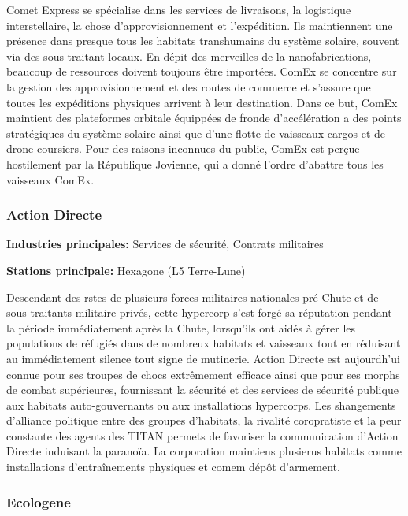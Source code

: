                   Comet Express se spécialise dans les services de livraisons, la logistique interstellaire, la chose d'approvisionnement et l'expédition. Ils maintiennent une présence dans presque tous les habitats transhumains du système solaire, souvent via des sous-traitant locaux. En dépit des merveilles de la nanofabrications, beaucoup de ressources doivent toujours être importées. ComEx se concentre sur la gestion des approvisionnement et des routes de commerce et s'assure que toutes les expéditions physiques arrivent à leur destination. Dans ce but, ComEx maintient des plateformes orbitale équippées de fronde d'accélération a des points stratégiques du système solaire ainsi que d'une flotte de vaisseaux cargos et de drone coursiers. Pour des raisons inconnues du public, ComEx est perçue hostilement par la République Jovienne, qui a donné l'ordre d'abattre tous les vaisseaux ComEx. 

                  \subsubsection{Action Directe} \label{sec:direct-action} 

                  \textbf{Industries principales:} Services de sécurité, Contrats militaires 

                  \textbf{Stations principale:} Hexagone (L5 Terre-Lune) 

                  Descendant des rstes de plusieurs forces militaires nationales pré-Chute et de sous-traitants militaire privés, cette hypercorp s'est forgé sa réputation pendant la période immédiatement après la Chute, lorsqu'ils ont aidés à gérer les populations de réfugiés dans de nombreux habitats et vaisseaux tout en réduisant au immédiatement silence tout signe de mutinerie. Action Directe est aujourdh'ui connue pour ses troupes de chocs extrêmement efficace ainsi que pour ses morphs de combat supérieures, fournissant la sécurité et des services de sécurité publique aux habitats auto-gouvernants ou aux installations hypercorps. Les shangements d'alliance politique entre des groupes d'habitats, la rivalité coropratiste et la peur constante des agents des TITAN permets de favoriser la communication d'Action Directe induisant la paranoïa. La corporation maintiens plusierus habitats comme installations d'entraînements physiques et comem dépôt d'armement. 

                  \subsubsection{Ecologene} \label{sec:ecologene} 

